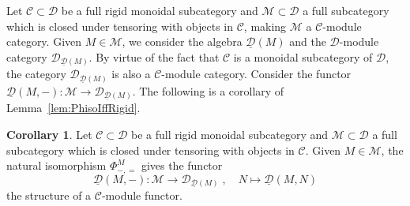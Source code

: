 \documentclass[12pt,dvipsnames]{article}
\numberwithin{equation}{section}
\theoremstyle{definition}
\newtheorem{corollary}[definition]{Corollary}
\newcommand{\cat}[1]{\mathcal{#1}}
\newcommand{\1}{\ensuremath{\mathbbm{1}}}
\newcommand{\blank}{{-}}
\newcommand{\bblank}{{=}}
\begin{document}
Let $\cat{C}\subset\cat{D}$ be a full rigid monoidal subcategory and $\cat{M}\subset\cat{D}$ a full subcategory which is closed under tensoring with objects in $\cat{C}$, making $\cat{M}$ a $\cat{C}$-module category. Given $M\in\cat{M}$, we consider the algebra $\underline{\cat{D}}(M)$
and the $\cat{D}$-module category $\cat{D}_{\underline{\cat{D}}(M)}$. By virtue of the fact that $\cat{C}$ is a monoidal subcategory of $\cat{D}$, the category $\cat{D}_{\underline{\cat{D}}(M)}$ is also a $\cat{C}$-module category. Consider the functor $\underline{\cat{D}}(M,\blank):\cat{M} \to \cat{D}_{\underline{\cat{D}}(M)}$. The following is a corollary of Lemma~\ref{lem:PhisoIffRigid}.

\begin{corollary}\label{cor:C-module-structure-from-rigid}
    Let $\cat{C}\subset\cat{D}$ be a full rigid monoidal subcategory and $\cat{M}\subset\cat{D}$ a full subcategory which is closed under tensoring with objects in $\cat{C}$. Given $M\in\cat{M}$, the natural isomorphism $\Phi^M_{\blank,\bblank}$ gives the functor
    \begin{equation}
        \underline{\cat{D}}(M,\blank):\cat{M} \to \cat{D}_{\underline{\cat{D}}(M)} \;,\quad N \mapsto \underline{\cat{D}}(M,N)
    \end{equation}
     the structure of a $\cat{C}$-module functor.
\end{corollary}
\end{document}
